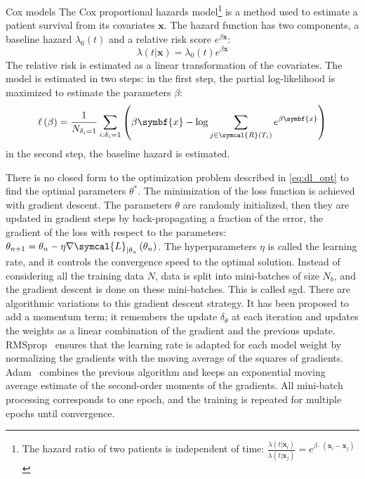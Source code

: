 \documentclass[../main.tex]{subfiles}
\begin{document}
		\begin{mybox}[label={box:cox}]{Cox models}
			The Cox proportional hazards model\footnote{The hazard ratio of two patients is independent of time: \(\frac{\lambda(t | \symbf{x}_{i})}{\lambda(t | \symbf{x}_{j})} = e^{\beta\cdot \left(\symbf{x}_{i} - \symbf{x}_{j}\right)}\)} is a method used to estimate a patient survival from its covariates \(\symbf{x}\).
			The hazard function has two components, a baseline hazard \(\lambda_0(t)\) and a relative risk score \(e^{\beta \symbf{x}}\):
			\[\lambda(t | \symbf{x}) = \lambda_0(t) e^{\beta \symbf{x}}\]
			The relative risk is estimated as a linear transformation of the covariates.
			The model is estimated in two steps: in the first step, the partial log-likelihood is maximized to estimate the parameters \(\beta\):
			\[\ell\left(\beta\right) = \frac{1}{N_{\delta_i = 1}} \sum_{i:\delta_i=1} \left(\beta \symbf{x} - \log \sum_{j \in \symcal{R}(T_i)}e^{\beta \symbf{x}} \right)\]
			in the second step, the baseline hazard is estimated.
		\end{mybox}

		There is no closed form to the optimization problem described in \cref{eq:dl_opt} to find the optimal parameters \(\theta^{*}\).
		The minimization of the loss function is achieved with gradient descent.
		The parameters \(\theta\) are randomly initialized, then they are updated in gradient steps by back-propagating a fraction of the error, \ie{}the gradient of the loss with respect to the parameters: \(\theta_{n+1} = \theta_{n} - \eta \nabla \symcal{L}_{|\theta_n}\left(\theta_{n}\right)\).
		The hyperparameters \(\eta\) is called the learning rate, and it controls the convergence speed to the optimal solution.
		Instead of considering all the training data \(N\), data is split into mini-batches of size \(N_b\), and the gradient descent is done on these mini-batches.
		This is called \gls{sgd}.
		There are algorithmic variations to this gradient descent strategy.
		It has been proposed to add a momentum term; it remembers the update \(\delta_{\theta}\) at each iteration and updates the weights as a linear combination of the gradient and the previous update.
		RMSprop~\cite{OptimRMSProp} ensures that the learning rate is adapted for each model weight by normalizing the gradients with the moving average of the squares of gradients.
		Adam~\cite{OptimAdam} combines the previous algorithm and keeps an exponential moving average estimate of the second-order moments of the gradients.
		All mini-batch processing corresponds to one epoch, and the training is repeated for multiple epochs until convergence.
\end{document}
